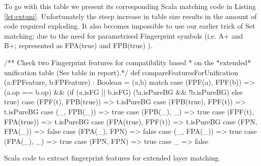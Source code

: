 To go with this table we present its corresponding Scala matching code in Listing \ref{lst:extuni}.
Unfortunately the steep increase in table size results in the amount of code required exploding.
It also becomes impossible to use our earlier trick of Set matching; due to the need for parametrised
Fingerprint symbols (i.e. A+ and B+; represented as FPA(true) and FPB(true) ).
\begin{listing}[H]
\begin{scalacode}
 /** Check two Fingerprint features for compatibility based
   * on the *extended* unification table (See table in report).*/
  def compareFeaturesForUnification (a:FPFeature, b:FPFeature) : Boolean = 
  (a,b) match {
    case (FPF(a), FPF(b))    => (a.op == b.op) && 
                                (if (a.isFG || b.isFG) 
                                    (!a.isPureBG && !b.isPureBG)
                                 else true)
    case (FPF(t), FPB(true)) => t.isPureBG
    case (FPB(true), FPF(t)) => t.isPureBG
    case (_, FPB(_))         => true
    case (FPB(_), _)         => true
    case (FPF(t), FPA(true)) => t.isPureBG
    case (FPA(true), FPF(t)) => t.isPureBG
    case (FPN, FPA(_))       => false
    case (FPA(_), FPN)       => false
    case (_, FPA(_))         => true
    case (FPA(_), _)         => true
    case (FPN, FPN)          => true
    case _                   => false
  }
\end{scalacode}
\caption{Scala code to extract fingerprint features for extended layer matching.}
\label{lst:extuni}
\end{listing}


